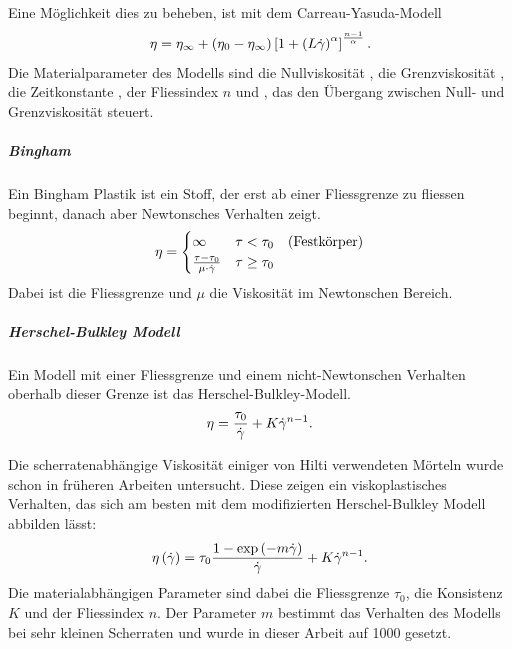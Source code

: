 Eine Möglichkeit dies zu beheben, ist mit dem Carreau-Yasuda-Modell
\begin{equation}
    \eta=\eta_\infty+\left( \eta_0-\eta_\infty \right)\left[ 1+\left( L\dot\gamma \right)^\alpha \right] ^{\frac{n-1}{\alpha}}.
    \label{eq:fg:carreauyasuda}
\end{equation}
Die Materialparameter des Modells sind die Nullviskosität , die Grenzviskosität , die Zeitkonstante , der Fliessindex $n$ und , das den Übergang zwischen Null- und Grenzviskosität steuert.
%
\subparagraph{Bingham}
Ein Bingham Plastik ist ein Stoff, der erst ab einer Fliessgrenze zu fliessen beginnt, danach aber Newtonsches Verhalten zeigt.
\begin{equation}
    \eta=
    \begin{cases}
        \infty                           & \tau<\tau_{0}    \quad \text{(Festkörper)}\\
        \frac{\tau-\tau_{0}}{\mu\cdot\dot\gamma} & \tau\geq\tau_{0}
    \end{cases}
    \label{eq:fg:bingham}
\end{equation}
Dabei ist  die Fliessgrenze und $\mu$ die Viskosität im Newtonschen Bereich.
%
\subparagraph{Herschel-Bulkley Modell}
Ein Modell mit einer Fliessgrenze und einem nicht-Newtonschen Verhalten oberhalb dieser Grenze ist das Herschel-Bulkley-Modell.
\begin{equation}
    \eta=  \frac{\tau_0}{\dot\gamma}+K\dot\gamma^{n-1}.
    \label{eq:fg:herschelbulkley}
\end{equation}

Die scherratenabhängige Viskosität einiger von Hilti verwendeten Mörteln wurde schon in früheren Arbeiten untersucht. Diese zeigen ein viskoplastisches Verhalten, das sich am besten mit dem modifizierten Herschel-Bulkley Modell abbilden lässt:
\begin{equation}
    \label{eq:modHB}
    \eta\left( \dot\gamma \right) = \tau_0 \frac{1-\exp \left( -m\dot\gamma \right)}{\dot\gamma}+K\dot\gamma^{n-1}.
\end{equation}
Die materialabhängigen Parameter sind dabei die Fliessgrenze $\tau_0$, die Konsistenz $K$ und der Fliessindex $n$. Der Parameter $m$ bestimmt das Verhalten des Modells bei sehr kleinen Scherraten und wurde in dieser Arbeit auf 1000 gesetzt.%
%
